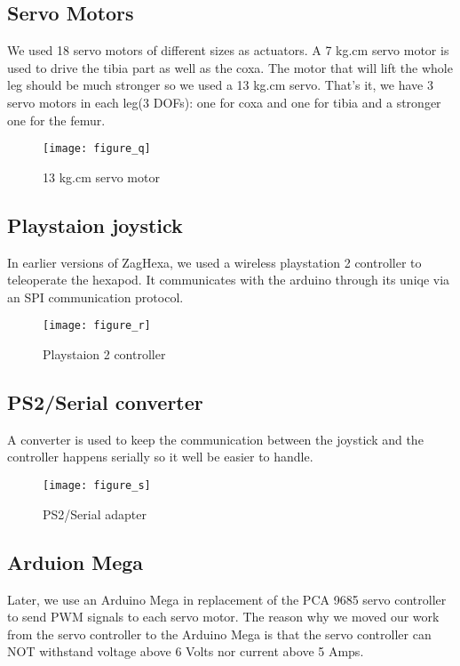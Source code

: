 \subsection{Servo Motors}
We used 18 servo motors of different sizes as actuators. A 7 kg.cm servo motor is used to drive the tibia part as well as the coxa. The motor that will lift the whole leg should be much stronger so we used a 13 kg.cm servo. That's it, we have 3 servo motors in each leg(3 DOFs): one for coxa and one for tibia and a stronger one for the femur.

\begin{figure}[h]
	\centering
	\texttt{[image: figure\_q]}
	\caption{13 kg.cm servo motor}
	\label{figure_q}
\end{figure}

\subsection{Playstaion joystick}
In earlier versions of ZagHexa, we used a wireless playstation 2 controller to teleoperate the hexapod. It communicates with the arduino through its uniqe via an SPI communication protocol.

\begin{figure}[h]
	\centering
	\texttt{[image: figure\_r]}
	\caption{Playstaion 2 controller}
	\label{figure_r}
\end{figure}

\subsection{PS2/Serial converter}
A converter is used to keep the communication between the joystick and the controller happens serially so it well be easier to handle.

\begin{figure}[h]
	\centering
	\texttt{[image: figure\_s]}
	\caption{PS2/Serial adapter}
	\label{figure_s}
\end{figure}

\subsection{Arduion Mega}
Later, we use an Arduino Mega in replacement of the PCA 9685 servo controller to send PWM signals to each servo motor. The reason why we moved our work from the servo controller to the Arduino Mega is that the servo controller can NOT withstand voltage above 6 Volts nor current above 5 Amps.

